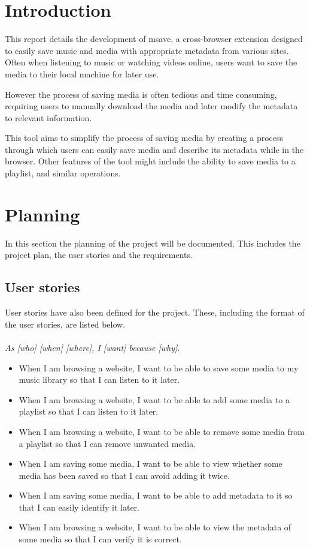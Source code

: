 





\section{Introduction}
This report details the development of msave, a cross-browser extension designed to easily save music and media with appropriate metadata from various sites.
Often when listening to music or watching videos online, users want to save the media to their local machine for later use. 

However the process of saving media is often tedious and time consuming, requiring users to manually download the media 
and later modify the metadata to relevant information. 

This tool aims to simplify the process of saving media by creating a process through which 
users can easily save media and describe its metadata while in the browser.
Other features of the tool might include the ability to save media to a playlist, and similar operations.




\section{Planning} \label{sec:planning}
In this section the planning of the project will be documented. 
This includes the project plan, the user stories and the requirements.

\subsection{User stories}
User stories have also been defined for the project. These, including the format of the user stories, are listed below.
\\
\\
\textit{As [who] [when] [where], I [want] because [why].} 
\\
\begin{itemize}
    \item When I am browsing a website, I want to be able to save some media to my music library so that I can listen to it later.
    \item When I am browsing a website, I want to be able to add some media to a playlist so that I can listen to it later.
    \item When I am browsing a website, I want to be able to remove some media from a playlist so that I can remove unwanted media.
    \item When I am saving some media, I want to be able to view whether some media has been saved so that I can avoid adding it twice.
    \item When I am saving some media, I want to be able to add metadata to it so that I can easily identify it later.
    \item When I am browsing a website, I want to be able to view the metadata of some media so that I can verify it is correct.
\end{itemize}

